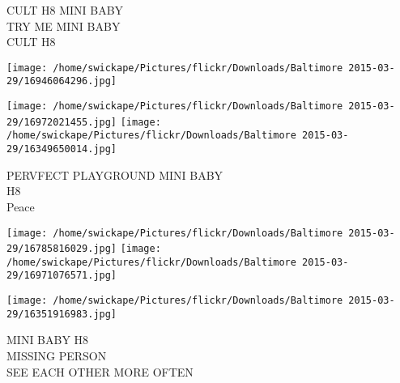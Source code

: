 \documentclass[10pt,letterpaper]{article}
\begin{document}
CULT H8 MINI BABY\\
TRY ME MINI BABY\\
CULT H8
\pagebreak

\texttt{[image: /home/swickape/Pictures/flickr/Downloads/Baltimore 2015-03-29/16946064296.jpg]}

\vspace{0.25in}
\texttt{[image: /home/swickape/Pictures/flickr/Downloads/Baltimore 2015-03-29/16972021455.jpg]}
\texttt{[image: /home/swickape/Pictures/flickr/Downloads/Baltimore 2015-03-29/16349650014.jpg]}

PERVFECT PLAYGROUND MINI BABY\\
H8\\
Peace
\pagebreak

\texttt{[image: /home/swickape/Pictures/flickr/Downloads/Baltimore 2015-03-29/16785816029.jpg]}
\texttt{[image: /home/swickape/Pictures/flickr/Downloads/Baltimore 2015-03-29/16971076571.jpg]}

\vspace{0.25in}
\texttt{[image: /home/swickape/Pictures/flickr/Downloads/Baltimore 2015-03-29/16351916983.jpg]}

MINI BABY H8\\
MISSING PERSON\\
SEE EACH OTHER MORE OFTEN
\pagebreak
\end{document}
